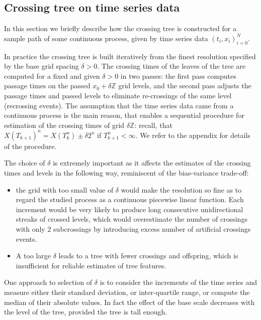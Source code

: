 
\subsection{Crossing tree on time series data} %
\label{sub:crossing_tree_on_time_series_data}

In this section we briefly describe how the crossing tree is constructed for a sample
path of some continuous process, given by time series data $(t_i, x_i)_{i=0}^N$.

In practice the crossing tree is built iteratively from the finest resolution
specified by the base grid spacing $\delta > 0$. The crossing times of the leaves
of the tree are computed for a fixed and given $\delta>0$ in two passes: the first
pass computes passage times on the passed $x_0+\delta \mathbb{Z}$ grid levels, and
the second pass adjusts the passage times and passed levels to eliminate re-crossings
of the same level (recrossing events). The assumption that the time series data
came from a continuous process is the main reason, that enables a sequential procedure
for estimation of the crossing times of grid $\delta\mathbb{Z}$: recall, that
$X(T_{k+1})^n = X(T_k^n) \pm\delta2^n$ if $T_{k+1}^n<\infty$. We refer to the
appendix for details of the procedure.

The choice of $\delta$ is extremely important as it affects the estimates of the
crossing times and levels in the following way, reminiscent of the bias-variance
trade-off:
\begin{itemize}
    \item the grid with too small value of $\delta$ would make the resolution so
    fine as to regard the studied process as a continuous piecewise linear function.
    Each increment would be very likely to produce long consecutive unidirectional
    streaks of crossed levels, which would overestimate the number of crossings
    with only 2 subcrossings by introducing excess number of artificial crossings
    events.
    \item A too large $\delta$ leads to a tree with fewer crossings and offspring,
    which is insufficient for reliable estimates of tree features.
\end{itemize}
One approach to selection of $\delta$ is to consider the increments of the time
series and measure either their standard deviation, or inter-quartile range, or
compute the median of their absolute values. In fact the effect of the base scale
decreases with the level of the tree, provided the tree is tall enough.

